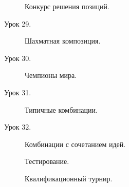 \begin{description}
Конкурс решения позиций.

\item [Урок 29.] Шахматная композиция.
\item [Урок 30.] Чемпионы мира.
\item [Урок 31.] Типичные комбинации.
\item [Урок 32.] Комбинации с сочетанием идей.

Тестирование.

Квалификационный турнир.
\end{description}

\vfill
\clearpage
\newpage
